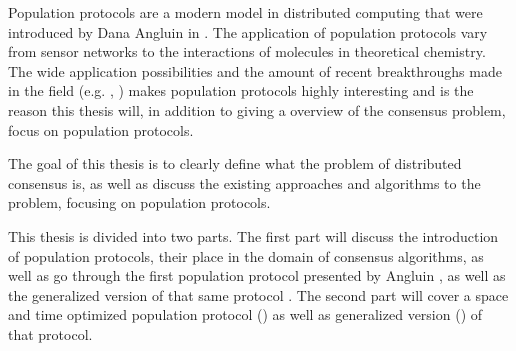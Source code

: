 Population protocols are a modern model in distributed computing that were introduced by Dana Angluin in \cite{angluinComputationNetworksPassively2006}. The application of population protocols vary from sensor networks to the interactions of molecules in theoretical chemistry. \cite{aspnesIntroductionPopulationProtocols2009} The wide application possibilities and the amount of recent breakthroughs made in the field (e.g. \cite{dotyTimeSpaceOptimal2022}, \cite{bankhamerPopulationProtocolsExact2022}) makes population protocols highly interesting and is the reason this thesis will, in addition to giving a overview of the consensus problem, focus on population protocols.

The goal of this thesis is to clearly define what the problem of distributed consensus is, as well as discuss the existing approaches and algorithms to the problem, focusing on population protocols.

This thesis is divided into two parts. The first part will  discuss the introduction of population protocols, their place in the domain of consensus algorithms, as well as go through the first population protocol presented by Angluin \cite{angluinSimplePopulationProtocol2008}, as well as the generalized version of that same protocol \cite{AspnesFastConverganceOfKOpinion2023}. The second part will cover a space and time optimized population protocol (\cite{dotyTimeSpaceOptimal2022}) as well as generalized version (\cite{bankhamerPopulationProtocolsExact2022}) of that protocol. 
